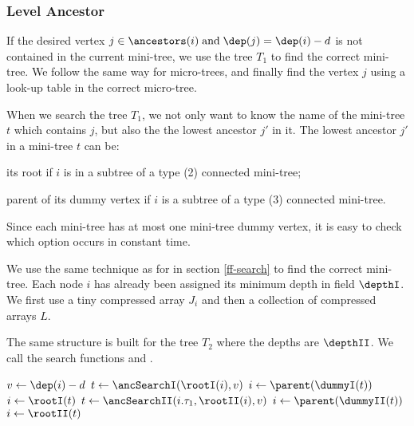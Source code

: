 \subsubsection{Level Ancestor}

If the desired vertex $j \in \ancestors(i) \booland \dep(j) = \dep(i) - d$ is not contained in the current mini-tree, we use the tree $T_1$ to find the correct mini-tree.
We follow the same way for micro-trees, and finally find the vertex $j$ using a look-up table in the correct micro-tree.

When we search the tree $T_1$, we not only want to know the name of the mini-tree $t$ which contains $j$, but also the the lowest ancestor $j'$ in it.
The lowest ancestor $j'$ in a mini-tree $t$ can be:
\begin{enuminline}
	\item its root if $i$ is in a subtree of a type (2) connected mini-tree;
	\item parent of its dummy vertex if $i$ is a subtree of a type (3) connected mini-tree.
\end{enuminline}
Since each mini-tree has at most one mini-tree dummy vertex, it is easy to check which option occurs in constant time.

We use the same technique as for \lrmSearch{} in section \ref{ff-search} to find the correct mini-tree.
Each node $i$ has already been assigned its minimum depth in field $\depthI$.
We first use a tiny compressed array $J_i$ and then a collection of compressed arrays $L$.

The same structure is built for the tree $T_2$ where the depths are $\depthII$.
We call the search functions \ancSearchI and \ancSearchII.

\begin{algorithm}
\begin{algorithmic}
	\State $v \gets \dep(i) - d$
		\State {}
	\EndIf
	 
		\State $t \gets \ancSearchI(\rootI(i), v)$
		 
			\State $i \gets \parent(\dummyI(t))$
		\Else {}
			\State $i \gets \rootI(t)$
		\EndIf
	\EndIf
	 
		\State $t \gets \ancSearchII(i.\tau_1, \rootII(i), v)$
		 
			\State $i \gets \parent(\dummyII(t))$
		\Else {}
			\State $i \gets \rootII(t)$
		\EndIf
	\EndIf
	\State {}
\EndFunction
\end{algorithmic}
\end{algorithm}

